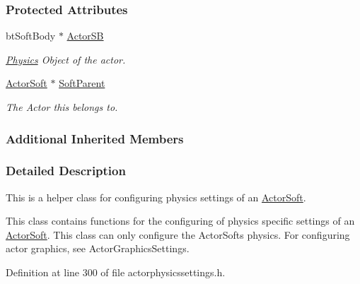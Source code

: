 \subsubsection*{Protected Attributes}
\begin{DoxyCompactItemize}
\item 
bt\-Soft\-Body $\ast$ \hyperlink{classMezzanine_1_1ActorSoftPhysicsSettings_a44408487d6458ee64320be6d1283c1c0}{Actor\-S\-B}
\begin{DoxyCompactList}\small\item\em \hyperlink{namespaceMezzanine_1_1Physics}{Physics} Object of the actor. \end{DoxyCompactList}\item 
\hypertarget{classMezzanine_1_1ActorSoftPhysicsSettings_aa895658bc511f318b4a31234823d3e5c}{\hyperlink{classMezzanine_1_1ActorSoft}{Actor\-Soft} $\ast$ \hyperlink{classMezzanine_1_1ActorSoftPhysicsSettings_aa895658bc511f318b4a31234823d3e5c}{Soft\-Parent}}\label{classMezzanine_1_1ActorSoftPhysicsSettings_aa895658bc511f318b4a31234823d3e5c}

\begin{DoxyCompactList}\small\item\em The Actor this belongs to. \end{DoxyCompactList}\end{DoxyCompactItemize}
\subsubsection*{Additional Inherited Members}


\subsubsection{Detailed Description}
This is a helper class for configuring physics settings of an \hyperlink{classMezzanine_1_1ActorSoft}{Actor\-Soft}. 

This class contains functions for the configuring of physics specific settings of an \hyperlink{classMezzanine_1_1ActorSoft}{Actor\-Soft}. This class can only configure the Actor\-Softs physics. For configuring actor graphics, see Actor\-Graphics\-Settings. 

Definition at line 300 of file actorphysicssettings.\-h.




